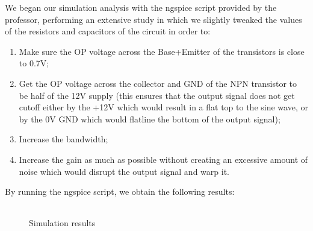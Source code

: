 \hspace{12pt} We began our simulation analysis with the ngspice script provided by the professor, performing an extensive study in which we slightly tweaked the values of the resistors and capacitors of the circuit in order to:
\begin{enumerate}
	\item{Make sure the OP voltage across the Base+Emitter of the transistors is close to 0.7V;}
	\item{Get the OP voltage across the collector and GND of the NPN transistor to be half of the 12V supply (this ensures that the output signal does not get cutoff either by the +12V which would result in a flat top to the sine wave, or by the 0V GND which would flatline the bottom of the output signal);}
	\item{Increase the bandwidth;}
	\item{Increase the gain as much as possible without creating an excessive amount of noise which would disrupt the output signal and warp it.}
\end{enumerate}

By running the ngspice script, we obtain the following results:

\begin{figure}[h]
	\centering
	\begin{tabular}{|c|c|}
		\hline
		
	\end{tabular}
	\caption{Simulation results}
\end{figure}


